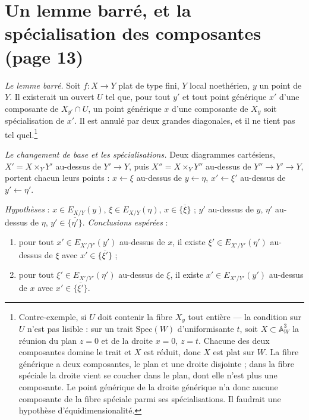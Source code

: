 \documentclass[11pt,a4paper]{article}
\begin{document}
\section*{Un lemme barré, et la spécialisation des composantes (page 13)}

\emph{Le lemme barré.} Soit $f : X \to Y$ plat de type fini, $Y$ local
noethérien, $y$ un point de $Y$. Il existerait un ouvert $U$ tel que, pour tout
$y'$ et tout point générique $x'$ d'une composante de $X_{y'} \cap U$, un point
générique $x$ d'une composante de $X_y$ soit spécialisation de $x'$. Il est
annulé par deux grandes diagonales, et il ne tient pas tel
quel.\footnote{Contre-exemple, si $U$ doit contenir la fibre $X_y$ tout
entière --- la condition sur $U$ n'est pas lisible : sur un trait
$\mathrm{Spec}(W)$ d'uniformisante $t$, soit $X \subset \mathbb{A}^3_W$ la
réunion du plan $z = 0$ et de la droite $x = 0$, $z = t$. Chacune des deux
composantes domine le trait et $X$ est réduit, donc $X$ est plat sur $W$. La
fibre générique a deux composantes, le plan et une droite disjointe ; dans la
fibre spéciale la droite vient se coucher dans le plan, dont elle n'est plus
une composante. Le point générique de la droite générique n'a donc aucune
composante de la fibre spéciale parmi ses spécialisations. Il faudrait une
hypothèse d'équidimensionalité.}

\emph{Le changement de base et les spécialisations.} Deux diagrammes
cartésiens, $X' = X \times_Y Y'$ au-dessus de $Y' \to Y$, puis
$X'' = X \times_Y Y''$ au-dessus de $Y'' \to Y' \to Y$, portent chacun leurs
points : $x \leftarrow \xi$ au-dessus de $y \leftarrow \eta$,
$x' \leftarrow \xi'$ au-dessus de $y' \leftarrow \eta'$.


\emph{Hypothèses} : $x \in E_{X/Y}(y)$, $\xi \in E_{X/Y}(\eta)$,
$x \in \overline{\{\xi\}}$ ; $y'$ au-dessus de $y$, $\eta'$ au-dessus de
$\eta$, $y' \in \overline{\{\eta'\}}$. \emph{Conclusions espérées} :

\begin{enumerate}
\item[a)] pour tout $x' \in E_{X'/Y'}(y')$ au-dessus de $x$, il existe
$\xi' \in E_{X'/Y'}(\eta')$ au-dessus de $\xi$ avec
$x' \in \overline{\{\xi'\}}$ ;
\item[b)] pour tout $\xi' \in E_{X'/Y'}(\eta')$ au-dessus de $\xi$, il existe
$x' \in E_{X'/Y'}(y')$ au-dessus de $x$ avec $x' \in \overline{\{\xi'\}}$.
\end{enumerate}
\end{document}
